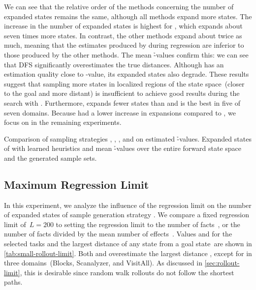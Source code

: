 We can see that the relative order of the methods concerning the number of expanded states remains the same, although all methods expand more states. The increase in the number of expanded states is highest for \hnnl{\dfs}, which expands about seven times more states. In contrast, the other methods expand about twice as much, meaning that the estimates produced by \dfs during regression are inferior to those produced by the other methods. The mean \h-values confirm this: we can see that DFS significantly overestimates the true distances. Although \bfs has an estimation quality close to \hstar-value, its expanded states also degrade. These results suggest that sampling more states in localized regions of the state space~(\bfs closer to the goal and \dfs more distant) is insufficient to achieve good results during the search with \gbfs. Furthermore, \hnnl{\bfsrw} expands fewer states than \hnnl{\rw} and is the best in five of seven domains. Because \hnnl{\bfsrw} had a lower increase in expansions compared to \hnnl{\rw}, we focus on \bfsrw in the remaining experiments.

\begin{table}[tb]
    \caption[Comparison of sampling strategies on estimated \h-values.]{Comparison of sampling strategies \bfs, \dfs, \rw, and \bfsrw on estimated \h-values. Expanded states of \gbfs with learned heuristics and mean \h-values over the entire forward state space and the generated sample sets.}
    \label{tab:small-sampling-h}
    \addmargin
    \centering
    
\end{table}

\subsection{Maximum Regression Limit}
\label{sec:small-exps-rollout-limit}

In this experiment, we analyze the influence of the regression limit on the number of expanded states of sample generation strategy \bfsrw. We compare a fixed regression limit of~$L=200$ to setting the regression limit to the number of facts~\facts, or the number of facts divided by the mean number of effects~\meanfx. Values \facts and \meanfx for the selected tasks and the largest distance of any state from a goal state~\ssdiameter are shown in \cref{tab:small-rollout-limit}. Both \facts and \meanfx overestimate the largest distance \ssdiameter, except for \meanfx in three domains~(Blocks, Scanalyzer, and VisitAll). As discussed in \cref{sec:rollout-limit}, this is desirable since random walk rollouts do not follow the shortest paths.

